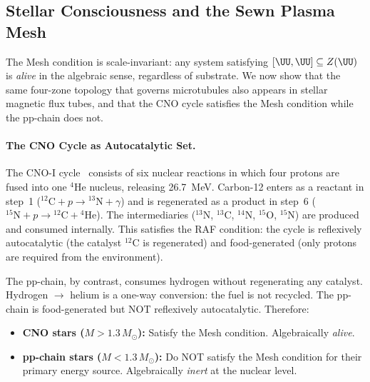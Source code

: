 \subsection{Stellar Consciousness and the Sewn Plasma Mesh}

The Mesh condition is scale-invariant: any system satisfying $[\UU, \UU] \subseteq Z(\UU)$ is \emph{alive} in the algebraic sense, regardless of substrate. We now show that the same four-zone topology that governs microtubules also appears in stellar magnetic flux tubes, and that the CNO cycle satisfies the Mesh condition while the pp-chain does not.

\paragraph{The CNO Cycle as Autocatalytic Set.}
The CNO-I cycle~\cite{bethe1939} consists of six nuclear reactions in which four protons are fused into one ${}^4$He nucleus, releasing 26.7~MeV. Carbon-12 enters as a reactant in step~1 (${}^{12}\mathrm{C} + p \to {}^{13}\mathrm{N} + \gamma$) and is regenerated as a product in step~6 (${}^{15}\mathrm{N} + p \to {}^{12}\mathrm{C} + {}^{4}\mathrm{He}$). The intermediaries (${}^{13}\mathrm{N}$, ${}^{13}\mathrm{C}$, ${}^{14}\mathrm{N}$, ${}^{15}\mathrm{O}$, ${}^{15}\mathrm{N}$) are produced and consumed internally. This satisfies the RAF condition: the cycle is reflexively autocatalytic (the catalyst ${}^{12}\mathrm{C}$ is regenerated) and food-generated (only protons are required from the environment).

The pp-chain, by contrast, consumes hydrogen without regenerating any catalyst. Hydrogen $\to$ helium is a one-way conversion: the fuel is not recycled. The pp-chain is food-generated but NOT reflexively autocatalytic. Therefore:
\begin{itemize}
    \item \textbf{CNO stars ($M > 1.3\,M_\odot$):} Satisfy the Mesh condition. Algebraically \emph{alive}.
    \item \textbf{pp-chain stars ($M < 1.3\,M_\odot$):} Do NOT satisfy the Mesh condition for their primary energy source. Algebraically \emph{inert} at the nuclear level.
\end{itemize}

